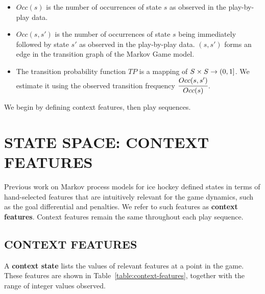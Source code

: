 \documentclass[]{article}
\begin{document}
\begin{itemize}
\item $Occ(s)$ is the number of occurrences of state $s$ as observed in the play-by-play data.
\item $Occ(s,s')$ is the number of occurrences of state $s$ being immediately followed by state $s'$ as observed in the play-by-play data. $(s,s')$ forms an edge in the transition graph of the Markov Game model.
\item The transition probability function $TP$ is a mapping of $S \times S \rightarrow (0,1]$. We estimate it using the observed transition frequency $\cfrac{Occ(s,s')}{Occ(s)}$.
\end{itemize}

We begin by defining context features, then play sequences.


\section{STATE SPACE: CONTEXT FEATURES}
\label{sec:context}

Previous work on Markov process models for ice hockey \citep{Thomas2013} defined states in terms of hand-selected features that are intuitively relevant for the game dynamics, such as the goal differential and penalties. We refer to such features as \textbf{context features}. Context features remain the same throughout each play sequence.


\subsection{CONTEXT FEATURES}
A \textbf{context state} lists the values of relevant features at a point in the game. These features are shown in Table~\ref{table:context-features}, together with the range of integer values observed.
\end{document}
